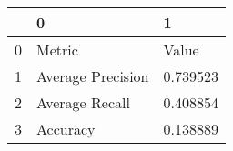 \begin{tabular}{lll}
\toprule
{} &                  0 &         1 \\
\midrule
0 &             Metric &     Value \\
1 &  Average Precision &  0.739523 \\
2 &     Average Recall &  0.408854 \\
3 &           Accuracy &  0.138889 \\
\bottomrule
\end{tabular}
